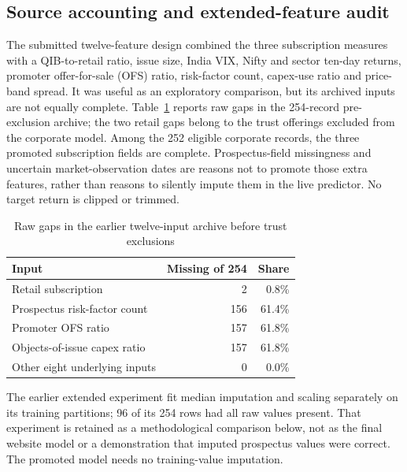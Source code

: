 \documentclass[runningheads]{llncs}
\begin{document}
\subsection{Source accounting and extended-feature audit}
The submitted twelve-feature design combined the three subscription measures with a QIB-to-retail ratio, issue size, India VIX, Nifty and sector ten-day returns, promoter offer-for-sale (OFS) ratio, risk-factor count, capex-use ratio and price-band spread. It was useful as an exploratory comparison, but its archived inputs are not equally complete. Table~\ref{tab:missing} reports raw gaps in the 254-record pre-exclusion archive; the two retail gaps belong to the trust offerings excluded from the corporate model. Among the 252 eligible corporate records, the three promoted subscription fields are complete. Prospectus-field missingness and uncertain market-observation dates are reasons not to promote those extra features, rather than reasons to silently impute them in the live predictor. No target return is clipped or trimmed.
\begin{table}[tb]
\caption{Raw gaps in the earlier twelve-input archive before trust exclusions}\label{tab:missing}
\centering
\begin{tabular}{@{}lrr@{}}\toprule
Input & Missing of 254 & Share\\\midrule
Retail subscription & 2 & 0.8\%\\
Prospectus risk-factor count & 156 & 61.4\%\\
Promoter OFS ratio & 157 & 61.8\%\\
Objects-of-issue capex ratio & 157 & 61.8\%\\
Other eight underlying inputs & 0 & 0.0\%\\\bottomrule
\end{tabular}
\end{table}
The earlier extended experiment fit median imputation and scaling separately on its training partitions; 96 of its 254 rows had all raw values present. That experiment is retained as a methodological comparison below, not as the final website model or a demonstration that imputed prospectus values were correct. The promoted model needs no training-value imputation.
\end{document}
